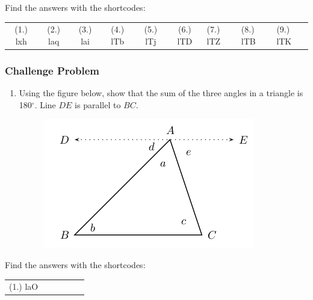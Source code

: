 \par {} Find the
answers with the shortcodes:
\par \begin{tabular}[h]{cccccc}
(1.) lxh  &  (2.) laq  &  (3.) lai  &  (4.) lTb  &  (5.) lTj  &  (6.) lTD  & 
(7.) lTZ  &  (8.) lTB  &  (9.) lTK  & \end{tabular}
\subsubsection{ Challenge Problem}
\begin{enumerate}[noitemsep, label=\textbf{\arabic*}. ] 
\item Using the figure below, show that the sum of the three angles in a
triangle is 180$^{\circ }$. Line $DE$ is parallel to $BC$.
\setcounter{subfigure}{0}
\begin{figure}[H] %
\begin{center}
\label{m39368*id320668!!!underscore!!!media}\label{
m39368*id320668!!!underscore!!!printimage}\includegraphics{
col11306.imgs/m39368_MG10C13_065.png} %
\vspace{2pt}
\vspace{.1in}
\end{center}
\end{figure}       \newline
\end{enumerate}

\par {} Find the
answers with the shortcodes:
\par \begin{tabular}[h]{cccccc}
(1.) laO  & \end{tabular}
